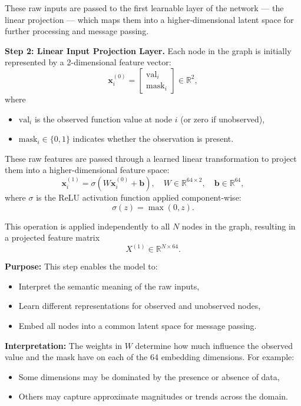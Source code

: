 \medskip
These raw inputs are passed to the first learnable layer of the network — the linear projection — which maps them into a higher-dimensional latent space for further processing and message passing.


%
{\bf Step 2: Linear Input Projection Layer.} Each node in the graph is initially represented by a 2-dimensional feature vector:
\[
\mathbf{x}_i^{(0)} = 
\begin{bmatrix}
\mathrm{val}_i \\
\mathrm{mask}_i
\end{bmatrix}
\in \mathbb{R}^2,
\]
where
\begin{itemize}
  \item $\mathrm{val}_i$ is the observed function value at node $i$ (or zero if unobserved),
  \item $\mathrm{mask}_i \in \{0, 1\}$ indicates whether the observation is present.
\end{itemize}

These raw features are passed through a learned linear transformation to project them into a higher-dimensional feature space:
\[
\mathbf{x}_i^{(1)} = \sigma\left( W \mathbf{x}_i^{(0)} + \mathbf{b} \right), \quad W \in \mathbb{R}^{64 \times 2}, \quad \mathbf{b} \in \mathbb{R}^{64},
\]
where $\sigma$ is the ReLU activation function applied component-wise:
\[
\sigma(z) = \max(0, z).
\]

This operation is applied independently to all $N$ nodes in the graph, resulting in a projected feature matrix
\[
X^{(1)} \in \mathbb{R}^{N \times 64}.
\]

\medskip
{\bf Purpose:} This step enables the model to:
\begin{itemize}
  \item Interpret the semantic meaning of the raw inputs,
  \item Learn different representations for observed and unobserved nodes,
  \item Embed all nodes into a common latent space for message passing.
\end{itemize}

\medskip
{\bf Interpretation:} The weights in $W$ determine how much influence the observed value and the mask have on each of the 64 embedding dimensions. For example:
\begin{itemize}
  \item Some dimensions may be dominated by the presence or absence of data,
  \item Others may capture approximate magnitudes or trends across the domain.
\end{itemize}

